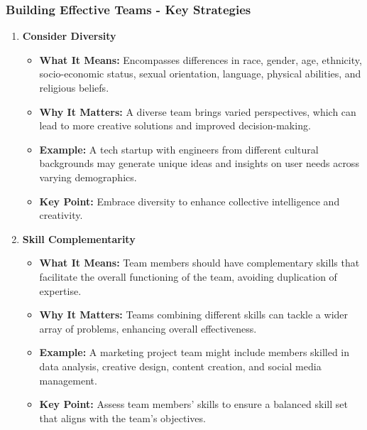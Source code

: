 \documentclass[aspectratio=169]{beamer}
\begin{document}
\begin{frame}[fragile]
    \frametitle{Building Effective Teams - Key Strategies}
    \begin{enumerate}
        \item \textbf{Consider Diversity}
        \begin{itemize}
            \item \textbf{What It Means:} Encompasses differences in race, gender, age, ethnicity, socio-economic status, sexual orientation, language, physical abilities, and religious beliefs.
            \item \textbf{Why It Matters:} A diverse team brings varied perspectives, which can lead to more creative solutions and improved decision-making.
            \item \textbf{Example:} A tech startup with engineers from different cultural backgrounds may generate unique ideas and insights on user needs across varying demographics.
            \item \textbf{Key Point:} Embrace diversity to enhance collective intelligence and creativity.
        \end{itemize}
        
        \item \textbf{Skill Complementarity}
        \begin{itemize}
            \item \textbf{What It Means:} Team members should have complementary skills that facilitate the overall functioning of the team, avoiding duplication of expertise.
            \item \textbf{Why It Matters:} Teams combining different skills can tackle a wider array of problems, enhancing overall effectiveness.
            \item \textbf{Example:} A marketing project team might include members skilled in data analysis, creative design, content creation, and social media management.
            \item \textbf{Key Point:} Assess team members' skills to ensure a balanced skill set that aligns with the team's objectives.
        \end{itemize}
    \end{enumerate}
\end{frame}
\end{document}
